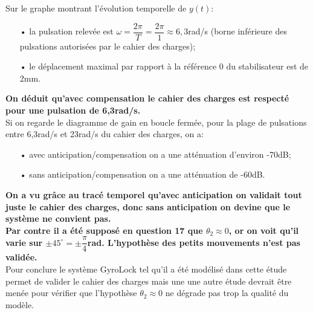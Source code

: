 \ifprof
\begin{corrige}
Sur le graphe montrant l'évolution temporelle de $y(t)$:
\begin{itemize}
\item[•] la pulsation relevée est $\omega = \dfrac{2\pi}{T} = \dfrac{2\pi}{1} \approx 6,3$rad/s (borne inférieure des pulsations autorisées par le cahier des charges);
\item[•] le déplacement maximal par rapport à la référence 0 du stabilisateur est de 2mm.
\end{itemize}

\textbf{On déduit qu'avec compensation le cahier des charges est respecté pour une pulsation de 6,3rad/s.}\\

Si on regarde le diagramme de gain en boucle fermée, pour la plage de pulsations entre 6,3rad/s et 23rad/s du cahier des charges, on a:

\begin{itemize}
\item[•] avec anticipation/compensation on a une atténuation d'environ -70dB;
\item[•] sans anticipation/compensation on a une atténuation de -60dB.
\end{itemize}

\textbf{On a vu grâce au tracé temporel qu'avec anticipation on validait tout juste le cahier des charges, donc sans anticipation on devine que le système ne convient pas.}\\

\textbf{Par contre il a été supposé en question 17 que $\theta_2 \approx 0$, or on voit qu'il varie sur $\pm 45^\circ = \pm \dfrac{\pi}{4}$rad. L'hypothèse des petits mouvements n'est pas validée.}\\

Pour conclure le système GyroLock tel qu'il a été modélisé dans cette étude permet de valider le cahier des charges mais une une autre étude devrait être menée pour vérifier que l'hypothèse $\theta_2 \approx 0$ ne dégrade pas trop la qualité du modèle.
\end{corrige}
\else
\fi

